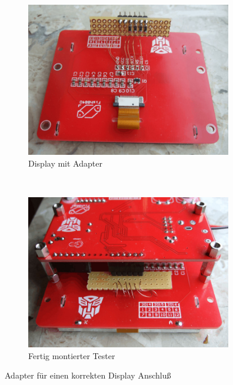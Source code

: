 \begin{figure}[H]
  \begin{subfigure}[b]{9cm}
    \centering
    \includegraphics[width=9cm]{../PNG/Fish8840Adapt1.jpg}
    \caption{Display mit Adapter}
  \end{subfigure}
  ~
  \begin{subfigure}[b]{9cm}
    \centering
    \includegraphics[width=9cm]{../PNG/Fish8840Adapt2.jpg}
    \caption{Fertig montierter Tester}
  \end{subfigure}
  \caption{Adapter für einen korrekten Display Anschluß}
  \label{fig:Fish8840Adapt}
\end{figure}

